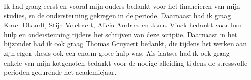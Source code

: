 Ik had graag eerst en vooral mijn ouders bedankt voor het financieren van mijn
studies, en de ondersteuning gekregen in de periode. Daarnaast had ik graag
Karel Dhondt, Stijn Volckaert, Alicia Andries en Jonas Vinck bedankt voor hun
hulp en ondersteuning tijdens het schrijven van deze scriptie. Daarnaast in het
bijzonder had ik ook graag Thomas Gruyaert bedankt, die tijdens het werken aan
zijn eigen thesis ook een enorm grote hulp was. Als laatste had ik ook graag
enkele van mijn kotgenoten bedankt voor de nodige afleiding tijdens de
stressvolle perioden gedurende het academiejaar.